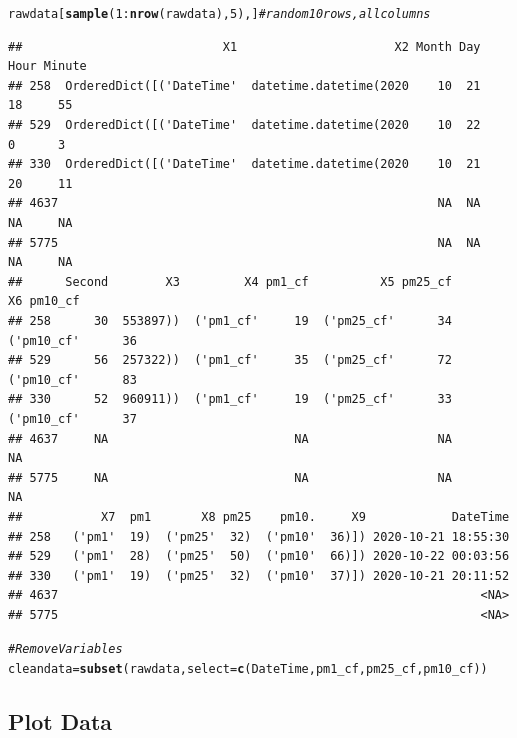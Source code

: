 \documentclass{article}\usepackage[]{graphicx}\usepackage[]{color}
\makeatletter
\newcommand{\hlnum}[1]{\textcolor[rgb]{0.686,0.059,0.569}{#1}}%
\newcommand{\hlcom}[1]{\textcolor[rgb]{0.678,0.584,0.686}{\textit{#1}}}%
\newcommand{\hlopt}[1]{\textcolor[rgb]{0,0,0}{#1}}%
\newcommand{\hlstd}[1]{\textcolor[rgb]{0.345,0.345,0.345}{#1}}%
\newcommand{\hlkwb}[1]{\textcolor[rgb]{0.69,0.353,0.396}{#1}}%
\newcommand{\hlkwc}[1]{\textcolor[rgb]{0.333,0.667,0.333}{#1}}%
\newcommand{\hlkwd}[1]{\textcolor[rgb]{0.737,0.353,0.396}{\textbf{#1}}}%
\newenvironment{kframe}{%
 \def\at@end@of@kframe{}%
 \ifinner\ifhmode%
  \def\at@end@of@kframe{\end{minipage}}%
  \begin{minipage}{\columnwidth}%
 \fi\fi%
 \def\FrameCommand##1{\hskip\@totalleftmargin \hskip-\fboxsep
 \colorbox{shadecolor}{##1}\hskip-\fboxsep
     \hskip-\linewidth \hskip-\@totalleftmargin \hskip\columnwidth}%
 \MakeFramed {\advance\hsize-\width
   \@totalleftmargin\z@ \linewidth\hsize
   \@setminipage}}%
 {\par\unskip\endMakeFramed%
 \at@end@of@kframe}
\newenvironment{knitrout}{}{} %
\makeatother
\begin{document}
\begin{knitrout}
\color{fgcolor}\begin{kframe}
\begin{alltt}
\hlstd{rawdata[}\hlkwd{sample}\hlstd{(}\hlnum{1}\hlopt{:}\hlkwd{nrow}\hlstd{(rawdata),} \hlnum{5}\hlstd{),]} \hlcom{# random 10 rows, all columns}
\end{alltt}
\begin{verbatim}
##                            X1                      X2 Month Day Hour Minute
## 258  OrderedDict([('DateTime'  datetime.datetime(2020    10  21   18     55
## 529  OrderedDict([('DateTime'  datetime.datetime(2020    10  22    0      3
## 330  OrderedDict([('DateTime'  datetime.datetime(2020    10  21   20     11
## 4637                                                     NA  NA   NA     NA
## 5775                                                     NA  NA   NA     NA
##      Second        X3         X4 pm1_cf          X5 pm25_cf          X6 pm10_cf
## 258      30  553897))  ('pm1_cf'     19  ('pm25_cf'      34  ('pm10_cf'      36
## 529      56  257322))  ('pm1_cf'     35  ('pm25_cf'      72  ('pm10_cf'      83
## 330      52  960911))  ('pm1_cf'     19  ('pm25_cf'      33  ('pm10_cf'      37
## 4637     NA                          NA                  NA                  NA
## 5775     NA                          NA                  NA                  NA
##           X7  pm1       X8 pm25    pm10.     X9            DateTime
## 258   ('pm1'  19)  ('pm25'  32)  ('pm10'  36)]) 2020-10-21 18:55:30
## 529   ('pm1'  28)  ('pm25'  50)  ('pm10'  66)]) 2020-10-22 00:03:56
## 330   ('pm1'  19)  ('pm25'  32)  ('pm10'  37)]) 2020-10-21 20:11:52
## 4637                                                           <NA>
## 5775                                                           <NA>
\end{verbatim}
\begin{alltt}
\hlcom{# Remove Variables}
\hlstd{cleandata} \hlkwb{=} \hlkwd{subset}\hlstd{(rawdata,} \hlkwc{select}\hlstd{=}\hlkwd{c}\hlstd{(DateTime, pm1_cf, pm25_cf, pm10_cf))}
\end{alltt}
\end{kframe}
\end{knitrout}

\subsection{Plot Data}
\end{document}
